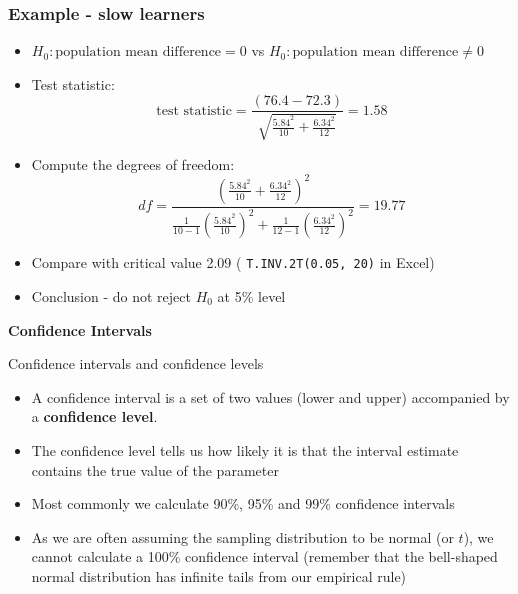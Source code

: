 \documentclass[12pt,xcolor=dvipsnames,handout,mathserif,aspectratio=169]{beamer}
\newcommand{\bbl}[1]{{\color{NavyBlue} \textbf{#1}}}
\begin{document}
\begin{frame}
\frametitle{Example - slow learners}
\begin{itemize}
\item $H_0: \mbox{population mean difference} = 0$ vs $H_0: \mbox{population mean difference} \ne 0$
\item Test statistic:
$$\mbox{test statistic} = \displaystyle\frac{(76.4 - 72.3)}{\sqrt{\frac{5.84^2}{10} + \frac{6.34^2}{12}}} = 1.58$$
\item Compute the degrees of freedom:
$$df = \frac{ \left( \frac{5.84^2}{10} + \frac{6.34^2}{12} \right)^2 }{ \frac{1}{10-1} \left( \frac{5.84^2}{10} \right)^2 + \frac{1}{12-1} \left( \frac{6.34^2}{12} \right)^2 } = 19.77$$
\item Compare with critical value 2.09 ( \texttt{T.INV.2T(0.05, 20)} in Excel)
\item Conclusion - do not reject $H_0$ at 5\% level
\vspace*{0.5cm}
\end{itemize}
\end{frame}

\begin{frame}[fragile]{}
\bbl{\Huge Confidence Intervals}\\ 
\vspace{0.5cm}
\end{frame}

\begin{frame}{Confidence intervals and confidence levels}

\begin{itemize}
\item A confidence interval is a set of two values (lower and upper) accompanied by a \bbl{confidence level}.
\item The confidence level tells us how likely it is that the interval estimate contains the true value of the parameter
\item Most commonly we calculate 90\%, 95\% and 99\% confidence intervals
\item As we are often assuming the sampling distribution to be normal (or $t$), we cannot calculate a 100\% confidence interval (remember that the bell-shaped normal distribution has infinite tails from our empirical rule)
\end{itemize}

\end{frame}
\end{document}
